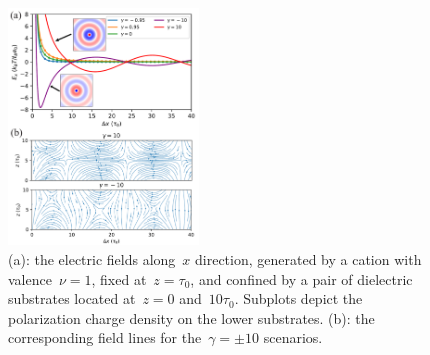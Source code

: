 \begin{figure}[htbp]
	\centering
	\includegraphics[width=0.45\textwidth]{figs/fig2.pdf}
	\caption{(a): the electric fields along~$x$ direction, generated by a cation with valence~$\nu=1$, fixed at~$z=\tau_0$, and confined by a pair of dielectric substrates located at~$z=0$ and~$10\tau_0$. Subplots depict the polarization charge density on the lower substrates. 
    (b): the corresponding field lines for the~$\gamma=\pm10$ scenarios.
		\label{fig:force_x}
            }
\end{figure}

